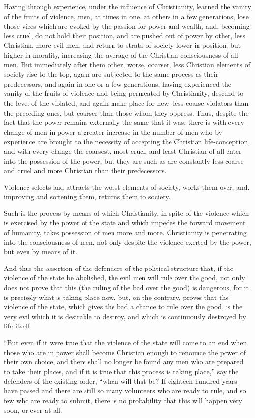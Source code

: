 \documentclass{book}
\begin{document}
Having through experience, under the influence of Christianity, learned the vanity of the fruits of violence, men, at times in one, at others in a few generations, lose those vices which are evoked by the passion for power and wealth, and, becoming less cruel, do not hold their position, and are pushed out of power by other, less Christian, more evil men, and return to strata of society lower in position, but higher in morality, increasing the average of the Christian consciousness of all men. But immediately after them other, worse, coarser, less Christian elements of society rise to the top, again are subjected to the same process as their predecessors, and again in one or a few generations, having experienced the vanity of the fruits of violence and being permeated by Christianity, descend to the level of the violated, and again make place for new, less coarse violators than the preceding ones, but coarser than those whom they oppress. Thus, despite the fact that the power remains externally the same that it was, there is with every change of men in power a greater increase in the number of men who by experience are brought to the necessity of accepting the Christian life-conception, and with every change the coarsest, most cruel, and least Christian of all enter into the possession of the power, but they are such as are constantly less coarse and cruel and more Christian than their predecessors.

Violence selects and attracts the worst elements of society, works them over, and, improving and softening them, returns them to society.

Such is the process by means of which Christianity, in spite of the violence which is exercised by the power of the state and which impedes the forward movement of humanity, takes possession of men more and more. Christianity is penetrating into the consciousness of men, not only despite the violence exerted by the power, but even by means of it.

And thus the assertion of the defenders of the political structure that, if the violence of the state be abolished, the evil men will rule over the good, not only does not prove that this (the ruling of the bad over the good) is dangerous, for it is precisely what is taking place now, but, on the contrary, proves that the violence of the state, which gives the bad a chance to rule over the good, is the very evil which it is desirable to destroy, and which is continuously destroyed by life itself.

“But even if it were true that the violence of the state will come to an end when those who are in power shall become Christian enough to renounce the power of their own choice, and there shall no longer be found any men who are prepared to take their places, and if it is true that this process is taking place,” say the defenders of the existing order, “when will that be? If eighteen hundred years have passed and there are still so many volunteers who are ready to rule, and so few who are ready to submit, there is no probability that this will happen very soon, or ever at all.
\end{document}
